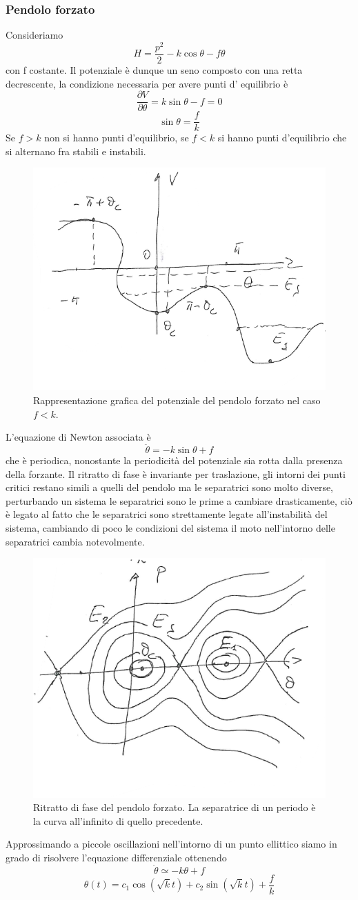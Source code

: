 \documentclass[
10pt, %
a4paper, %
oneside, %
headinclude,footinclude, %
BCOR5mm, %
]{scrartcl}
\begin{document}
\subsubsection{Pendolo forzato}
Consideriamo 
\[H = \frac{p^2}{2}-k\cos\theta-f\theta\]
con f costante. Il potenziale è dunque un seno composto con una retta decrescente, la condizione necessaria per avere punti d' equilibrio è
\[\frac{\partial V}{\partial \theta} = k\sin\theta-f= 0\]
\[\sin\theta = \frac{f}{k}\]
Se \(f>k\) non si hanno punti d'equilibrio, se \(f<k\) si hanno punti d'equilibrio che si alternano fra stabili e instabili. 
\begin{figure}[h!]
	\centering
	\includegraphics[width=0.6\linewidth]{pendolo-forzato}
	\caption{Rappresentazione grafica del potenziale del pendolo forzato nel caso \(f<k\).}
	\label{fig:pendolo-forzato}
\end{figure}
\FloatBarrier
L'equazione di Newton associata è
\[\ddot{\theta} = -k\sin\theta+f\]
che è periodica, nonostante la periodicità del potenziale sia rotta dalla presenza della forzante. Il ritratto di fase è invariante per traslazione, gli intorni dei punti critici restano simili a quelli del pendolo ma le separatrici sono molto diverse, perturbando un sistema le separatrici sono le prime a cambiare drasticamente, ciò è legato al fatto che le separatrici sono strettamente legate all'instabilità del sistema, cambiando di poco le condizioni del sistema il moto nell'intorno delle separatrici cambia notevolmente.
\begin{figure}[h!]
	\centering
	\includegraphics[width=0.6\linewidth]{pendolo-forzato-2}
	\caption{Ritratto di fase del pendolo forzato. La separatrice di un periodo è la curva all'infinito di quello precedente.}
	\label{fig:pendolo-forzato-2}
\end{figure}
\FloatBarrier
Approssimando a piccole oscillazioni nell'intorno di un punto ellittico siamo in grado di risolvere l'equazione differenziale ottenendo
\[\ddot{\theta} \simeq -k\theta+f\]
\[\theta (t) = c_1\cos(\sqrt{k} t) + c_2\sin(\sqrt{k} t) +\frac{f}{k}\]
\end{document}

